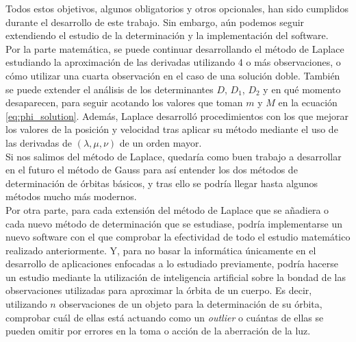 Todos estos objetivos, algunos obligatorios y otros opcionales, han sido cumplidos durante el desarrollo de este trabajo. Sin embargo, aún podemos seguir extendiendo el estudio de la determinación y la implementación del software.\\

Por la parte matemática, se puede continuar desarrollando el método de Laplace estudiando la aproximación de las derivadas utilizando 4 o más observaciones, o cómo utilizar una cuarta observación en el caso de una solución doble. También se puede extender el análisis de los determinantes $D$, $D_1$, $D_2$ y en qué momento desaparecen, para seguir acotando los valores que toman $m$ y $M$ en la ecuación \eqref{eq:phi_solution}. Además, Laplace desarrolló procedimientos con los que mejorar los valores de la posición y velocidad tras aplicar su método mediante el uso de las derivadas de $(\lambda,\mu,\nu)$ de un orden mayor.\\

Si nos salimos del método de Laplace, quedaría como buen trabajo a desarrollar en el futuro el método de Gauss para así entender los dos métodos de determinación de órbitas básicos, y tras ello se podría llegar hasta algunos métodos mucho más modernos.\\

Por otra parte, para cada extensión del método de Laplace que se añadiera o cada nuevo método de determinación que se estudiase, podría implementarse un nuevo software con el que comprobar la efectividad de todo el estudio matemático realizado anteriormente. Y, para no basar la informática únicamente en el desarrollo de aplicaciones enfocadas a lo estudiado previamente, podría hacerse un estudio mediante la utilización de inteligencia artificial sobre la bondad de las observaciones utilizadas para aproximar la órbita de un cuerpo. Es decir, utilizando $n$ observaciones de un objeto para la determinación de su órbita, comprobar cuál de ellas está actuando como un \textit{outlier} o cuántas de ellas se pueden omitir por errores en la toma o acción de la aberración de la luz.


